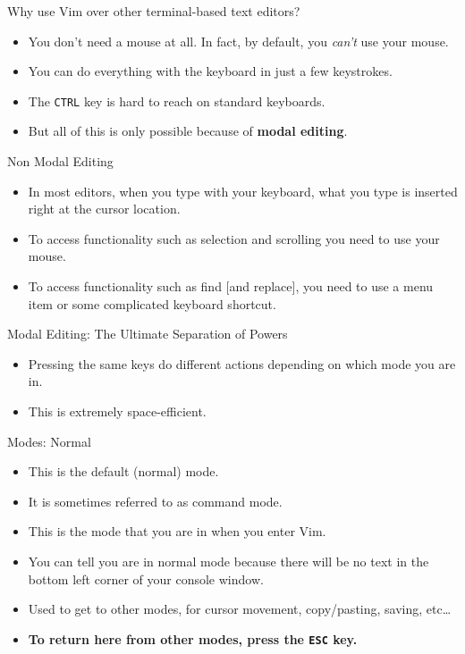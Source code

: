 \documentclass{lug}
\begin{document}
\begin{frame}{Why use Vim over other terminal-based text editors?}
    \begin{itemize}[<+->]
        \item You don't need a mouse at all. In fact, by default, you
            \textit{can't} use your mouse.

        \item You can do everything with the keyboard in just a few keystrokes.

        \item The \texttt{CTRL} key is hard to reach on standard keyboards.

        \item But all of this is only possible because of \textbf{modal
            editing}.
    \end{itemize}
\end{frame}

\begin{frame}{Non Modal Editing}
    \begin{itemize}[<+->]
        \item In most editors, when you type with your keyboard, what you type
            is inserted right at the cursor location.
        \item To access functionality such as selection and scrolling you need
            to use your mouse.
        \item To access functionality such as find [and replace], you need to
            use a menu item or some complicated keyboard shortcut.
    \end{itemize}
\end{frame}

\begin{frame}{Modal Editing: The Ultimate Separation of Powers}
    \begin{itemize}
        \item Pressing the same keys do different actions depending on which
            mode you are in.
        \item This is extremely space-efficient.
    \end{itemize}
\end{frame}

\begin{frame}{Modes: Normal}
    \begin{itemize}
        \item This is the default (normal) mode.
        \item It is sometimes referred to as command mode.
        \item This is the mode that you are in when you enter Vim.
        \item You can tell you are in normal mode because there will be no text
            in the bottom left corner of your console window.
        \item Used to get to other modes, for cursor movement, copy/pasting,
            saving, etc\dots
        \item \textbf{To return here from other modes, press the \texttt{ESC}
            key.}
    \end{itemize}
\end{frame}
\end{document}
